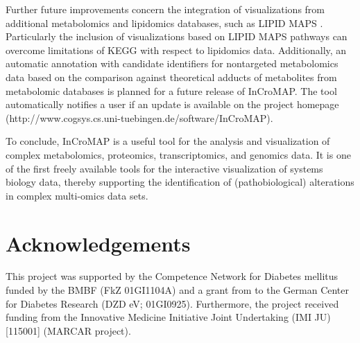 \documentclass[final,5p,times,twocolumn]{elsarticle}
\begin{document}
Further future improvements concern the integration of visualizations from additional metabolomics and lipidomics databases, such as LIPID MAPS \cite{Sud2007}. Particularly the inclusion of visualizations based on LIPID MAPS pathways can overcome limitations of KEGG with respect to lipidomics data. Additionally, an automatic annotation with candidate identifiers for nontargeted metabolomics data based on the comparison against theoretical adducts of metabolites from metabolomic databases is planned for a future release of InCroMAP. The tool automatically notifies a user if an update is available on the project homepage (http://www.cogsys.cs.uni-tuebingen.de/software/InCroMAP).

To conclude, InCroMAP is a useful tool for the analysis and visualization of complex metabolomics, proteomics, transcriptomics, and genomics data. It is one of the first freely available tools for the interactive visualization of systems biology data, thereby supporting the identification of (pathobiological) alterations in complex multi-omics data sets.

\section{Acknowledgements}
This project was supported by the Competence Network for Diabetes mellitus funded by the BMBF (FkZ 01GI1104A) and a grant from to the German Center for Diabetes Research (DZD eV; 01GI0925). Furthermore, the project received funding from the Innovative Medicine Initiative Joint Undertaking (IMI JU) [115001] (MARCAR project).














\end{document}
